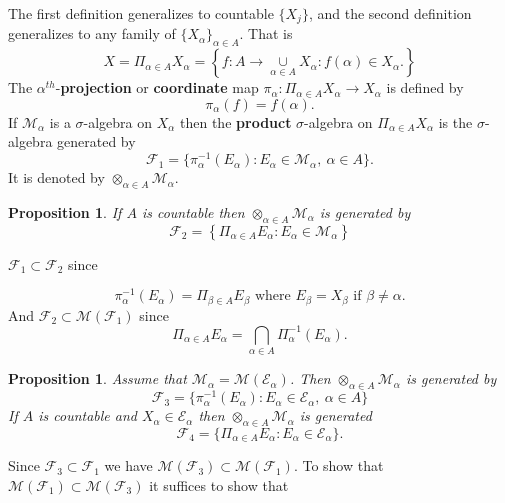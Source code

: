 \documentclass[12pt]{report}
\newtheorem{prop}[theorem]{Proposition}
\begin{document}
The first definition generalizes to countable $\{X_j\}$, and the second
definition generalizes to any family of $\{X_\alpha\}_{\alpha
\in A}$.  That is
\[  X = {\Pi}_{\alpha \in A} X_\alpha = \left \{f: A
\longrightarrow
\underset{\alpha\in A}{\cup}  X_\alpha: f(\alpha) \in X_\alpha.
\right \}
\]
 The $\alpha^{th}$-{\bf projection} or
 {\bf coordinate} map
$\pi_\alpha: {\Pi}_{\alpha \in A}X_\alpha \longrightarrow X_\alpha$ is
defined by
\[
\pi_\alpha (f) = f(\alpha).
\]  If $\mathcal{M}_\alpha$ is a $\sigma$-algebra on $X_\alpha$ then the
{\bf product} $\sigma$-algebra on
 ${\Pi}_{\alpha \in A}X_\alpha$ is the
$\sigma$-algebra generated by
\[
\mathcal{F}_1 = \{\pi^{-1}_\alpha (E_\alpha): E_\alpha \in
\mathcal{M}_\alpha, \
\alpha \in A\}.
\]  It is denoted by ${\otimes}_{\alpha \in A}
\mathcal{M}_\alpha $.

\begin{prop}  If $A$ is countable then
${\otimes}_{\alpha \in A}
\mathcal{M}_\alpha $ is generated by
\[
\mathcal{F}_2 = \left \{{\Pi}_{\alpha \in A} E_\alpha: E_\alpha \in
\mathcal{M}_\alpha \right \}
\]
\end{prop}

\vspace{.25cm}
  $\mathcal{F}_1 \subset \mathcal{F}_2$ since

\[
\pi^{-1}_\alpha (E_\alpha) = {\Pi}_{\beta \in A} E_\beta
\mbox{ where } E_\beta = X_\beta \mbox{ if } \beta \ne \alpha.
\]  And $\mathcal{F}_2 \subset
\mathcal{M}(\mathcal{F}_1)$ since
\[ {\Pi}_{\alpha \in A} E_\alpha = \bigcap_{\alpha \in A}
\Pi^{-1}_\alpha (E_\alpha).
\]


\begin{prop}   Assume that $\mathcal{M}_\alpha =
\mathcal{M} (\mathcal{E}_\alpha)$. 
 Then ${\otimes}_{\alpha
\in A} \mathcal{M}_\alpha$ is generated by
\[
\mathcal{F}_3 = \{\pi^{-1}_\alpha (E_\alpha): E_\alpha \in
\mathcal{E}_\alpha, \
\alpha \in A\}
\] If $A$ is countable and $X_\alpha \in \mathcal{E}_\alpha$ then
${\otimes}_{\alpha \in A} \mathcal{M}_\alpha$ is generated
\[
\mathcal{F}_4 = \{ {\Pi}_{\alpha \in A} E_\alpha:  E_\alpha \in
\mathcal{E}_\alpha\}.
\]
\end{prop}

\vspace{.15cm}
  Since  $\mathcal{F}_3 \subset \mathcal{F}_1$ we
have
$\mathcal{M}(\mathcal{F}_3) \subset \mathcal{M} (\mathcal{F}_1)$.  To
show that
$\mathcal{M} (\mathcal{F}_1) \subset \mathcal{M} (\mathcal{F}_3)$ it
suffices to show that
\end{document}

